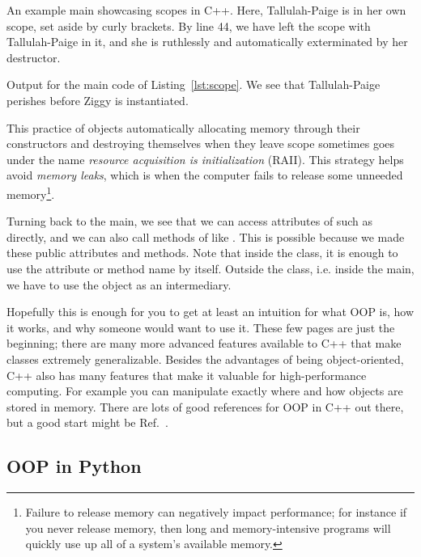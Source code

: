 \begin{code*}
\caption{An example main showcasing scopes in C++. Here,
Tallulah-Paige is in her own scope, set aside by
curly brackets. By line 44, we have left the scope with
Tallulah-Paige in it, and she is ruthlessly and
automatically exterminated by her destructor.}
\label{lst:scope}
\end{code*}
\begin{code*}
\caption{Output for the main code of Listing~\ref{lst:scope}.
We see that Tallulah-Paige perishes before Ziggy is instantiated.}
\label{lst:scopeOut}
\end{code*}

This practice of objects automatically allocating memory through their
constructors and destroying themselves when they leave scope
sometimes goes under the name
{\it resource acquisition is initialization} (RAII).
This strategy helps avoid {\it memory leaks},
which is when the computer fails to release some unneeded 
memory\footnote{Failure to release memory can negatively impact performance;
for instance if you never release memory, then long and memory-intensive
programs will quickly use up all of a system's available memory.}.

Turning back to the main, we see that we can access attributes of
 such as  directly, and we can also call
methods of  like . This is possible because
we made these public attributes and methods. Note that inside the class,
it is enough to use the attribute or method name by itself. Outside the
class, i.e. inside the main, we have to use the object as an 
intermediary.

Hopefully this is enough for you to get at least an intuition for
what OOP is, how it works, and why someone would want to use it. These
few pages are just the beginning; there are many more advanced
features available to C++ that make classes extremely generalizable.
Besides the advantages of being object-oriented, C++ also has many
features that make it valuable for high-performance computing.
For example you can manipulate exactly where and how objects
are stored in memory. There are lots of good references for OOP
in C++ out there, but a good start might be Ref.~\cite{tp:cpp}.\\

\subsection{OOP in Python}

